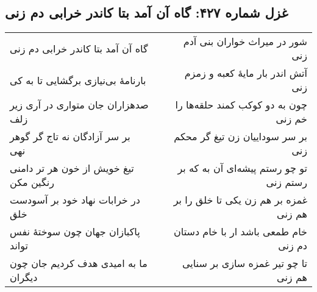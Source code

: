 \begin{center}
\section*{غزل شماره ۴۲۷: گاه آن آمد بتا کاندر خرابی دم زنی}
\label{sec:427}
\begin{longtable}{l p{0.5cm} r}
گاه آن آمد بتا کاندر خرابی دم زنی
&&
شور در میراث خواران بنی آدم زنی
\\
بارنامهٔ بی‌نیازی برگشایی تا به کی
&&
آتش اندر بار مایهٔ کعبه و زمزم زنی
\\
صدهزاران جان متواری در آری زیر زلف
&&
چون به دو کوکب کمند حلقه‌ها را خم زنی
\\
بر سر آزادگان نه تاج گر گوهر نهی
&&
بر سر سوداییان زن تیغ گر محکم زنی
\\
تیغ خویش از خون هر تر دامنی رنگین مکن
&&
تو چو رستم پیشه‌ای آن به که بر رستم زنی
\\
در خرابات نهاد خود بر آسودست خلق
&&
غمزه بر هم زن یکی تا خلق را بر هم زنی
\\
پاکبازان جهان چون سوختهٔ نفس تواند
&&
خام طمعی باشد ار با خام دستان دم زنی
\\
ما به امیدی هدف کردیم جان چون دیگران
&&
تا چو تیر غمزه سازی بر سنایی هم زنی
\\
\end{longtable}
\end{center}

